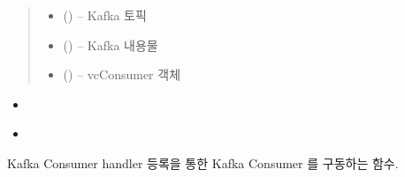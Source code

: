 \documentclass[a4paper,10pt,english]{sphinxmanual}
\begin{document}
\begin{fulllineitems}
\begin{fulllineitems}
\begin{quote}
\begin{description}
\begin{itemize}
\item {} 
\sphinxAtStartPar
{} () – Kafka 토픽 

\item {} 
\sphinxAtStartPar
{} () – Kafka 내용물

\item {} 
\sphinxAtStartPar
{} ({\hyperref[\detokenize{_VCConsumer:vcConsumer}]{}}) – vcConsumer 객체

\end{itemize}

\end{description}\end{quote}


\nopagebreak

\begin{itemize}
\item {} 
\sphinxAtStartPar
{\hyperref[\detokenize{_VCModule:vcModule.editFile}]{}}

\item {} 
\sphinxAtStartPar
{\hyperref[\detokenize{_VCModule:vcModule.commit}]{}}

\end{itemize}



\end{fulllineitems}


\begin{fulllineitems}
\label{\detokenize{_VCConsumer:vcConsumer.run}}
\pysigstartsignatures
{}
\pysigstopsignatures
\sphinxAtStartPar
Kafka Consumer handler 등록을 통한 Kafka Consumer 를 구동하는 함수.

\end{fulllineitems}


\end{fulllineitems}
\end{document}
